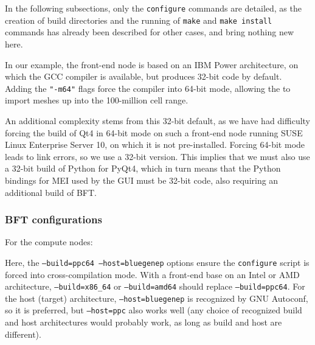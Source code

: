 \documentclass[a4paper,10pt,twoside]{article}
\begin{document}
In the following subsections, only the \texttt{configure} commands are
detailed, as the creation of build directories and the running of
\texttt{make} and \texttt{make install} commands has already
been described for other cases, and bring nothing new here.

In our example, the front-end node is based on an IBM Power architecture,
on which the GCC compiler is available, but produces 32-bit code by default.
Adding the \texttt{"-m64"} flags force the compiler into 64-bit mode, allowing
the \pcs to import meshes up into the 100-million cell range.

An additional complexity stems from this 32-bit default, as we have
had difficulty forcing the build of Qt4 in 64-bit mode on such
a front-end node running SUSE Linux Enterprise Server 10, on which
it is not pre-installed. Forcing 64-bit mode leads to link errors,
so we use a 32-bit version. This implies that we must also use a
32-bit build of Python for PyQt4, which in turn means that the Python
bindings for MEI used by the GUI must be 32-bit code,
also requiring an additional build of BFT.

\subsubsection{BFT configurations}

For the compute nodes:


Here, the \texttt{--build=ppc64 --host=bluegenep} options ensure the
\texttt{configure} script is forced into cross-compilation mode.
With a front-end base on an Intel or AMD architecture,
\texttt{--build=x86\_64} or \texttt{--build=amd64} should replace
\texttt{--build=ppc64}. For the host (target) architecture,
\texttt{--host=bluegenep} is recognized by GNU Autoconf,
so it is preferred, but \texttt{--host=ppc} also works well
(any choice of recognized build and host architectures would
probably work, as long as build and host are different).
\end{document}

